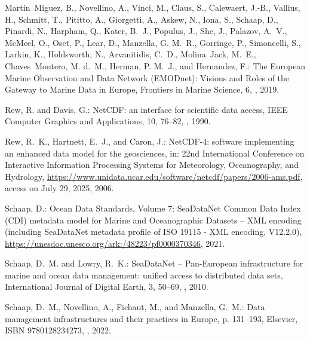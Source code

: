 \documentclass[essd,manuscript]{copernicus}
\begin{document}
\begin{thebibliography}{52}
Martín~Míguez, B., Novellino, A., Vinci, M., Claus, S., Calewaert, J.-B.,
  Vallius, H., Schmitt, T., Pititto, A., Giorgetti, A., Askew, N., Iona, S.,
  Schaap, D., Pinardi, N., Harpham, Q., Kater, B.~J., Populus, J., She, J.,
  Palazov, A.~V., McMeel, O., Oset, P., Lear, D., Manzella, G. M.~R., Gorringe,
  P., Simoncelli, S., Larkin, K., Holdsworth, N., Arvanitidis, C.~D.,
  Molina~Jack, M.~E., Chaves~Montero, M. d.~M., Herman, P. M.~J., and
  Hernandez, F.: The European Marine Observation and Data Network (EMODnet):
  Visions and Roles of the Gateway to Marine Data in Europe, Frontiers in
  Marine Science, 6, , 2019.

Rew, R. and Davis, G.: NetCDF: an interface for scientific data access, IEEE
  Computer Graphics and Applications, 10, 76--82, , 1990.

Rew, R.~K., Hartnett, E.~J., and Caron, J.: {NetCDF-4: software implementing an
  enhanced data model for the geosciences}, in: {22nd International Conference
  on Interactive Information Processing Systems for Meteorology, Oceanography,
  and Hydrology},
  \urlprefix\url{https://www.unidata.ucar.edu/software/netcdf/papers/2006-ams.pdf},
  access on July 29, 2025, 2006.

Schaap, D.: {Ocean Data Standards, Volume 7: SeaDataNet Common Data Index (CDI)
  metadata model for Marine and Oceanographic Datasets – XML encoding
  (including SeaDataNet metadata profile of ISO 19115 - XML encoding,
  V12.2.0)},
  \urlprefix\url{https://unesdoc.unesco.org/ark:/48223/pf0000370346}, 2021.

Schaap, D.~M. and Lowry, R.~K.: {SeaDataNet – Pan-European infrastructure for
  marine and ocean data management: unified access to distributed data sets},
  International Journal of Digital Earth, 3, 50–69,
  , 2010.

Schaap, D.~M., Novellino, A., Fichaut, M., and Manzella, G.~M.: Data management
  infrastructures and their practices in Europe, p. 131–193, Elsevier, ISBN
  9780128234273, , 2022.


\end{thebibliography}
\end{document}
